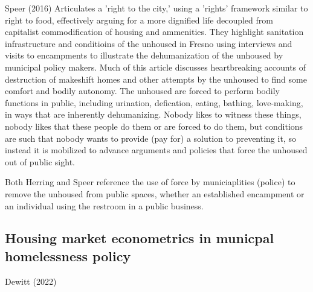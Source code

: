 Speer (2016) Articulates a 'right to the city,' using a 'rights'
framework similar to right to food, effectively arguing for a more
dignified life decoupled from capitalist commodification of housing
and ammenities. They highlight sanitation infrastructure and
conditioins of the unhoused in Fresno using interviews and visits to
encampments to illustrate the dehumanization of the unhoused by
municipal policy makers. Much of this article discusses heartbreaking
accounts of destruction of makeshift homes and other attempts by the
unhoused to find some comfort and bodily autonomy. The unhoused are
forced to perform bodily functions in public, including urination,
defication, eating, bathing, love-making, in ways that are inherently
dehumanizing. Nobody likes to witness these things, nobody likes that
these people do them or are forced to do them, but conditions are such
that nobody wants to provide (pay for) a solution to preventing it, so
instead it is mobilized to advance arguments and policies that force
the unhoused out of public sight.

Both Herring and Speer reference the use of force by municiaplities
(police) to remove the unhoused from public spaces, whether an
established encampment or an individual using the restroom in a public
business.

\subsection{Housing market econometrics in municpal homelessness policy}
Dewitt (2022)

